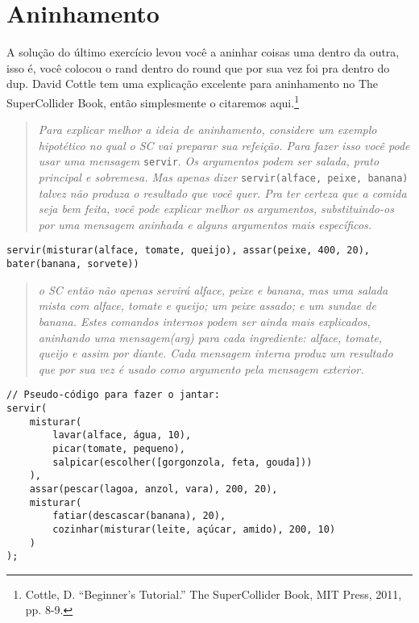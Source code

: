 \section{Aninhamento}
\label{sec:nesting}

A solução do último exercício levou você a aninhar coisas uma dentro da outra, isso é, você colocou o rand dentro do round que por sua vez foi pra dentro do dup. David Cottle tem uma explicação excelente para aninhamento no The SuperCollider Book, então simplesmente o citaremos aqui.\footnote{Cottle, D. ``Beginner's Tutorial.'' The SuperCollider Book, MIT Press, 2011, pp. 8-9.}

\begin{quotation}
\textit{Para explicar melhor a ideia de aninhamento, considere um exemplo hipotético no qual o SC vai preparar sua refeição. Para fazer isso você pode usar uma mensagem} \texttt{servir}. \textit{Os argumentos podem ser salada, prato principal e sobremesa. Mas apenas dizer} \texttt{servir(alface, peixe, banana)} \textit{talvez não produza o resultado que você quer. Pra ter certeza que a comida seja bem feita, você pode explicar melhor os argumentos, substituindo-os por uma mensagem aninhada e alguns argumentos mais específicos.}
\end{quotation}

\texttt{servir(misturar(alface, tomate, queijo), assar(peixe, 400, 20), bater(banana, sorvete))
}
\begin{quotation}
\textit{o SC então não apenas servirá alface, peixe e banana, mas uma salada mista com alface, tomate e queijo; um peixe assado; e um sundae de banana. Estes comandos internos podem ser ainda mais explicados, aninhando uma mensagem(arg) para cada ingrediente: alface, tomate, queijo e assim por diante. Cada mensagem interna produz um resultado que por sua vez é usado como argumento pela mensagem exterior.}
\end{quotation}

\begin{lstlisting}[style=SuperCollider-IDE, basicstyle=\scttfamily\footnotesize, label=code-dinner]
// Pseudo-código para fazer o jantar: 
servir(
	misturar(
		lavar(alface, água, 10),
		picar(tomate, pequeno),
		salpicar(escolher([gorgonzola, feta, gouda]))
	),
	assar(pescar(lagoa, anzol, vara), 200, 20),
	misturar(
		fatiar(descascar(banana), 20),
		cozinhar(misturar(leite, açúcar, amido), 200, 10)
	)
);
\end{lstlisting}

